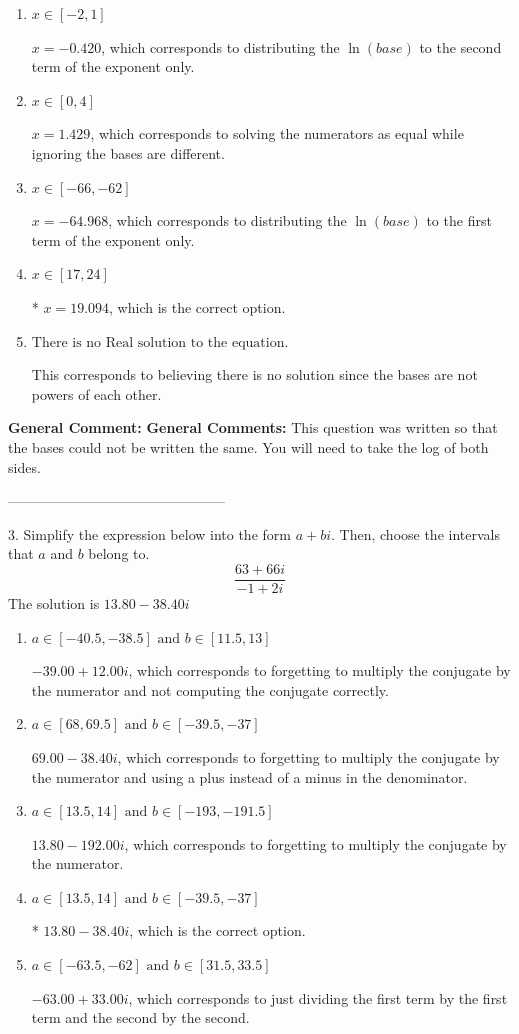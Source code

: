 \documentclass{extbook}[14pt]
\begin{document}
\begin{enumerate}[label=\Alph*.] 
\item $ x \in [-2, 1] $ 

 $x = -0.420$, which corresponds to distributing the $\ln(base)$ to the second term of the exponent only. 
\item $ x \in [0, 4] $ 

 $x = 1.429$, which corresponds to solving the numerators as equal while ignoring the bases are different. 
\item $ x \in [-66, -62] $ 

 $x = -64.968$, which corresponds to distributing the $\ln(base)$ to the first term of the exponent only. 
\item $ x \in [17, 24] $ 

 * $x = 19.094$, which is the correct option. 
\item $ \text{There is no Real solution to the equation.} $ 

 This corresponds to believing there is no solution since the bases are not powers of each other. 
\end{enumerate} 
 
\textbf{General Comment:} \textbf{General Comments:} This question was written so that the bases could not be written the same. You will need to take the log of both sides. 

-----------------------------------------------

3. Simplify the expression below into the form $a+bi$. Then, choose the intervals that $a$ and $b$ belong to.
\[ \frac{63 + 66 i}{-1 + 2 i} \] 
The solution is $ 13.80  - 38.40 i $ 

\begin{enumerate}[label=\Alph*.] 
\item $ a \in [-40.5, -38.5] \text{ and } b \in [11.5, 13] $ 

  $-39.00  + 12.00 i$, which corresponds to forgetting to multiply the conjugate by the numerator and not computing the conjugate correctly. 
\item $ a \in [68, 69.5] \text{ and } b \in [-39.5, -37] $ 

  $69.00  - 38.40 i$, which corresponds to forgetting to multiply the conjugate by the numerator and using a plus instead of a minus in the denominator. 
\item $ a \in [13.5, 14] \text{ and } b \in [-193, -191.5] $ 

  $13.80  - 192.00 i$, which corresponds to forgetting to multiply the conjugate by the numerator. 
\item $ a \in [13.5, 14] \text{ and } b \in [-39.5, -37] $ 

 * $13.80  - 38.40 i$, which is the correct option. 
\item $ a \in [-63.5, -62] \text{ and } b \in [31.5, 33.5] $ 

  $-63.00  + 33.00 i$, which corresponds to just dividing the first term by the first term and the second by the second. 
\end{enumerate} 
 
\end{document}
